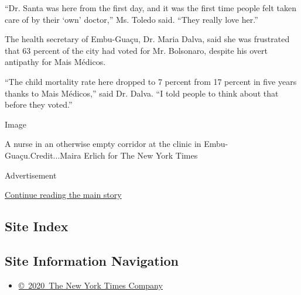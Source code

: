 ``Dr. Santa was here from the first day, and it was the first time
people felt taken care of by their `own' doctor,'' Ms. Toledo said.
``They really love her.''

The health secretary of Embu-Guaçu, Dr. Maria Dalva, said she was
frustrated that 63 percent of the city had voted for Mr. Bolsonaro,
despite his overt antipathy for Mais Médicos.

``The child mortality rate here dropped to 7 percent from 17 percent in
five years thanks to Mais Médicos,'' said Dr. Dalva. ``I told people to
think about that before they voted.''

Image

A nurse in an otherwise empty corridor at the clinic in
Embu-Guaçu.Credit...Maira Erlich for The New York Times

Advertisement

\protect\hyperlink{after-bottom}{Continue reading the main story}

\hypertarget{site-index}{%
\subsection{Site Index}\label{site-index}}

\hypertarget{site-information-navigation}{%
\subsection{Site Information
Navigation}\label{site-information-navigation}}

\begin{itemize}
\tightlist
\item
  \href{https://help.nytimes3xbfgragh.onion/hc/en-us/articles/115014792127-Copyright-notice}{©~2020~The
  New York Times Company}
\end{itemize}

